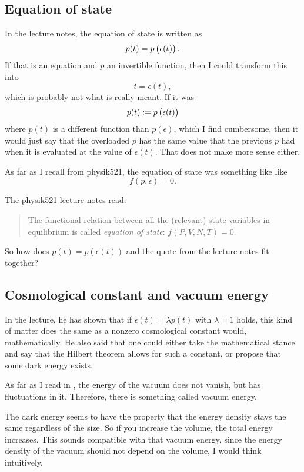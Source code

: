 \subsection*{Equation of state}

In the lecture notes, the equation of state is written as
\[
    p(t) = p\del{\epsilon(t)}.
\]
If that is an equation and $p$ an invertible function, then I could transform
this into
\[
    t = \epsilon(t),
\]
which is probably not what is really meant. If it was
\[
    p(t) := p\del{\epsilon(t)}
\]
where $p(t)$ is a different function than $p(\epsilon)$, which I find
cumbersome, then it would just say that the overloaded $p$ has the same value
that the previous $p$ had when it is evaluated at the value of $\epsilon(t)$.
That does not make more sense either.

As far as I recall from physik521, the equation of state was something like
like
\[
    f(p, \epsilon) = 0.
\]

The physik521 lecture notes read:
\begin{quote}
    The functional relation between all the (relevant) state variables in
    equilibrium is called \emph{equation of state}: $f(P, V, N, T) = 0$.
\end{quote}

So how does $p(t) = p(\epsilon(t))$ and the quote from the lecture notes fit
together?

\vfill
\vspace*{10cm}

\subsection*{Cosmological constant and vacuum energy}

In the lecture, he has shown that if $\epsilon(t) = \lambda p(t)$ with $\lambda
= 1$ holds, this kind of matter does the same as a nonzero cosmological
constant would, mathematically. He also said that one could either take the
mathematical stance and say that the Hilbert theorem allows for such a
constant, or propose that some dark energy exists.

As far as I read in \parencite{penrose-road_to_reality}, the energy of the
vacuum does not vanish, but has fluctuations in it. Therefore, there is
something called vacuum energy.

The dark energy seems to have the property that the energy density stays the
same regardless of the size. So if you increase the volume, the total energy
increases. This sounds compatible with that vacuum energy, since the energy
density of the vacuum should not depend on the volume, I would think
intuitively.


